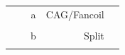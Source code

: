 \begin{table}[H]
\begin{tabular*}{\columnwidth}{@{\extracolsep{\fill}}clcrl}
                                           &                                                                                                            & a          & CAG/Fancoil      &                                                                                                                                                                                                                                                                                                                                                                                                                                                                           \\
                                           &                                                                                                            &            &                  &                                                                                                                                                                                                                                                                                                                                                                                                                                                                           \\
                                           &                                                                                                            & b          & Split            &                                                                                                                                                                                                                                                                                                                                                                                                                                                                           \\
                                           &                                                                                                            &            &                  &                                                                                                                                                                                                                                                                                                                                                                                                                                                                           \\

\end{tabular*}
\end{table}
